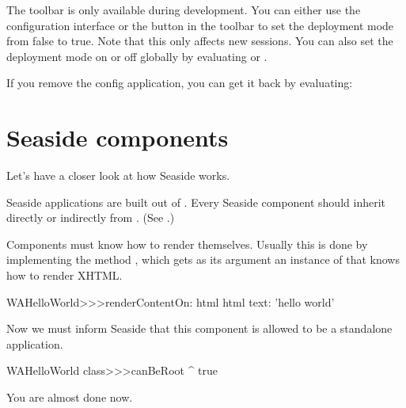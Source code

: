 \documentclass[a4paper,10pt,twoside]{book}
\begin{document}
The toolbar is only available during development.
You can either use the configuration interface or the  button in the toolbar to set the deployment mode from false to true.
Note that this only affects new sessions.
You can also set the deployment mode on or off globally by evaluating
 
or
.

If you remove the config application, you can get it back by evaluating:
 

\section{Seaside components}

Let's have a closer look at how Seaside works.

Seaside applications are built out of .
Every Seaside component should inherit directly or indirectly from . (See .)


Components must know how to render themselves.
Usually this is done by implementing the method , which gets as its argument an instance of  that knows how to render XHTML.

\begin{code}{}
WAHelloWorld>>>renderContentOn: html
	html text: 'hello world'
\end{code}

Now we must inform Seaside that this component is allowed to be a standalone application.


\begin{code}{}
WAHelloWorld class>>>canBeRoot
	^ true
\end{code}

You are almost done now.

\end{document}
